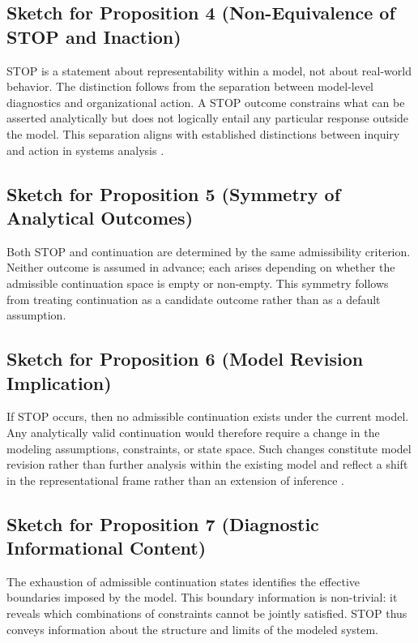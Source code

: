 \subsection*{Sketch for Proposition 4 (Non-Equivalence of STOP and Inaction)}
STOP is a statement about representability within a model, not about real-world behavior. The distinction follows from the separation between model-level diagnostics and organizational action. A STOP outcome constrains what can be asserted analytically but does not logically entail any particular response outside the model. This separation aligns with established distinctions between inquiry and action in systems analysis \cite{churchman1971}.

\subsection*{Sketch for Proposition 5 (Symmetry of Analytical Outcomes)}
Both STOP and continuation are determined by the same admissibility criterion. Neither outcome is assumed in advance; each arises depending on whether the admissible continuation space is empty or non-empty. This symmetry follows from treating continuation as a candidate outcome rather than as a default assumption.

\subsection*{Sketch for Proposition 6 (Model Revision Implication)}
If STOP occurs, then no admissible continuation exists under the current model. Any analytically valid continuation would therefore require a change in the modeling assumptions, constraints, or state space. Such changes constitute model revision rather than further analysis within the existing model and reflect a shift in the representational frame rather than an extension of inference \cite{rosen1985}.

\subsection*{Sketch for Proposition 7 (Diagnostic Informational Content)}
The exhaustion of admissible continuation states identifies the effective boundaries imposed by the model. This boundary information is non-trivial: it reveals which combinations of constraints cannot be jointly satisfied. STOP thus conveys information about the structure and limits of the modeled system.
